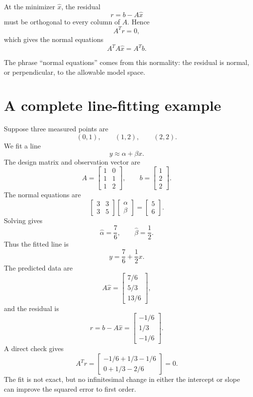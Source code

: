 At the minimizer \(\widehat x\), the residual
\[
  r=b-A\widehat x
\]
must be orthogonal to every column of \(A\).  Hence
\[
  A^Tr=0,
\]
which gives the normal equations
\[
  \boxed{A^TA\widehat x=A^Tb.}
\]

The phrase ``normal equations'' comes from this normality: the residual is normal, or perpendicular, to the allowable model space.

\section{A complete line-fitting example}

Suppose three measured points are
\[
  (0,1),\qquad (1,2),\qquad (2,2).
\]
We fit a line
\[
  y\approx\alpha+\beta x.
\]
The design matrix and observation vector are
\[
  A=
  \begin{bmatrix}
    1&0\\
    1&1\\
    1&2
  \end{bmatrix},
  \qquad
  b=
  \begin{bmatrix}
    1\\2\\2
  \end{bmatrix}.
\]
The normal equations are
\[
  \begin{bmatrix}
    3&3\\
    3&5
  \end{bmatrix}
  \begin{bmatrix}
    \alpha\\\beta
  \end{bmatrix}
  =
  \begin{bmatrix}
    5\\6
  \end{bmatrix}.
\]
Solving gives
\[
  \widehat\alpha=\frac76,
  \qquad
  \widehat\beta=\frac12.
\]
Thus the fitted line is
\[
  y=\frac76+\frac12x.
\]
The predicted data are
\[
  A\widehat x=
  \begin{bmatrix}
    7/6\\5/3\\13/6
  \end{bmatrix},
\]
and the residual is
\[
  r=b-A\widehat x
  =
  \begin{bmatrix}
    -1/6\\1/3\\-1/6
  \end{bmatrix}.
\]
A direct check gives
\[
  A^Tr=
  \begin{bmatrix}
    -1/6+1/3-1/6\\
    0+1/3-2/6
  \end{bmatrix}
  =0.
\]
The fit is not exact, but no infinitesimal change in either the intercept or slope can improve the squared error to first order.

